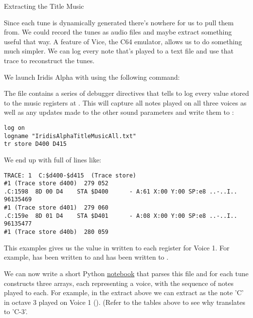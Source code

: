 \begin{tcolorbox}[%
  breakable,
  parbox = false,
  frame hidden,
  sharp corners,
  after skip=10pt,
  overlay broken = {
    \draw[]
      (frame.north west) rectangle (frame.south east);},
]{}
Extracting the Title Music

Since each tune is dynamically generated there's nowhere for us to pull them from. We could record
the tunes as audio files and maybe extract something useful that way. A feature of Vice, the C64
emulator, allows us to do something much simpler. We can log every note that's played to a 
text file and use that trace to reconstruct the tunes.

We launch Iridis Alpha with  using the following command:


The  file contains a series of debugger directives that tells 
to log every value stored to the music registers at . This will capture
all notes played on all three voices as well as any updates made to the other sound parameters
and write them to :

\begin{lstlisting}
log on
logname "IridisAlphaTitleMusicAll.txt"
tr store D400 D415
\end{lstlisting}

We end up with  full of lines like:

\begin{lstlisting}[basicstyle=\tiny]
TRACE: 1  C:$d400-$d415  (Trace store)
#1 (Trace store d400)  279 052
.C:1598  8D 00 D4    STA $D400      - A:61 X:00 Y:00 SP:e8 ..-..I..   96135469
#1 (Trace store d401)  279 060
.C:159e  8D 01 D4    STA $D401      - A:08 X:00 Y:00 SP:e8 ..-..I..   96135477
#1 (Trace store d40b)  280 059
\end{lstlisting}

This examples gives us the value in  written to each register for Voice 1. For example, 
has been written to  and  has been written to .

We can now write a short Python \href{https://github.com/mwenge/iatheory/tree/main/notebooks}{notebook} that
parses this file and for each tune constructs three arrays, each representing a voice, with the sequence
of notes played to each. For example, in the extract above we can extract  as the note 'C'
in octave 3 played on Voice 1 (). (Refer to the tables above to see why 
translates to 'C-3'.


\end{tcolorbox}
